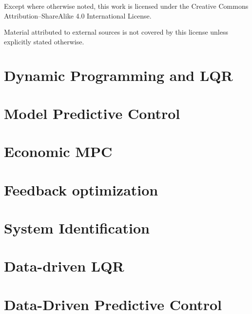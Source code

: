 \documentclass[11pt,a4paper]{article}
\begin{document}
\vspace{0.8cm}

\noindent\small
Except where otherwise noted, this work is licensed under the
Creative Commons Attribution--ShareAlike 4.0 International License.

\medskip

\noindent\small
Material attributed to external sources is not covered by this license
unless explicitly stated otherwise.

\vspace*{\fill}

\clearpage

\tableofcontents
\newpage

\section{Dynamic Programming and LQR}


\newpage
\section{Model Predictive Control}

\newpage

\section{Economic MPC}

\newpage

\section{Feedback optimization}

\newpage

\section{System Identification}

\newpage

\section{Data-driven LQR}

\newpage

\section{Data-Driven Predictive Control}

\newpage
\end{document}

